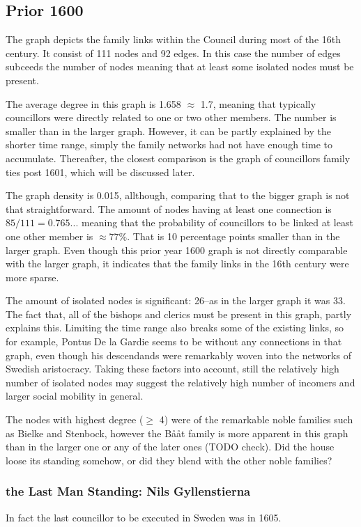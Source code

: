 \subsection{Prior 1600}
The graph depicts the family links within the Council during most of the 16th century. It consist of 111 nodes and 92 edges. In this case the number of edges subceeds the number of nodes meaning that at least some isolated nodes must be present. 

The average degree in this graph is 1.658 $\approx$ 1.7, meaning that typically councillors were directly related to one or two other members. The number is smaller than in the larger graph. However, it can be partly explained by the shorter time range, simply the family networks had not have enough time to accumulate. Thereafter, the closest comparison is the graph of councillors family ties post 1601, which will be discussed later.

The graph density is 0.015, allthough, comparing that to the bigger graph is not that straightforward. The amount of nodes having at least one connection is $85/111 = 0.765...$ meaning that the probability of councillors to be linked at least one other member is $\approx 77\%$. That is 10 percentage points smaller than in the larger graph. Even though this prior year 1600 graph is not directly comparable with the larger graph, it indicates that the family links in the 16th century were more sparse.

The amount of isolated nodes is significant: 26–as in the larger graph it was 33. The fact that, all of the bishops and clerics must be present in this graph, partly explains this. Limiting the time range also breaks some of the existing links, so for example, Pontus De la Gardie seems to be without any connections in that graph, even though his descendands were remarkably woven into the networks of Swedish aristocracy. Taking these factors into account, still the relatively high number of isolated nodes may suggest the relatively high number of incomers and larger social mobility in general.

The nodes with highest degree ($\geq$ 4) were of the remarkable noble families such as Bielke and Stenbock, however the Bååt family is more apparent in this graph than in the larger one or any of the later ones (TODO check). Did the house loose its standing somehow, or did they blend with the other noble families?

\subsubsection{the Last Man Standing: Nils Gyllenstierna}
In fact the last councillor to be executed in Sweden was in 1605.%

